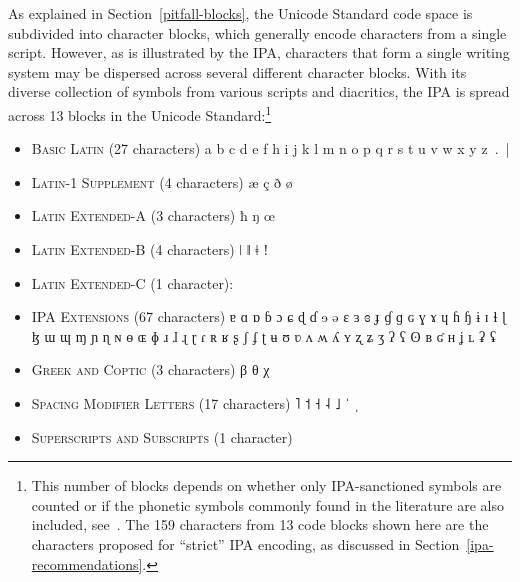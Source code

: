 As explained in Section~\ref{pitfall-blocks}, the Unicode Standard code space is
subdivided into character blocks, which generally encode characters from a
single script. However, as is illustrated by the IPA, characters that form a
single writing system may be dispersed across several different character
blocks. With its diverse collection of symbols from various scripts and
diacritics, the IPA is spread across 13 blocks in the Unicode
Standard:\footnote{This number of blocks depends on whether only IPA-sanctioned
symbols are counted or if the phonetic symbols commonly found in the literature
are also included, see~\cite[Appendix~C]{Moran2012}. The 159 characters from 13 
code blocks shown here are the characters proposed for ``strict'' IPA encoding, 
as discussed in Section~\ref{ipa-recommendations}.}

\begin{itemize}[itemsep=4pt]
	\item \textsc{Basic Latin }(27 characters) \newline 
	a b c d e f h i j k l m n o p q r s t u v w x y z~.~|
	\item \textsc{Latin-1 Supplement} (4 characters) \newline 
	æ ç ð ø
	\item \textsc{Latin Extended-A} (3 characters) \newline 
	ħ ŋ œ
	\item \textsc{Latin Extended-B} (4 characters) \newline 
	ǀ ǁ ǂ ǃ
	\item \textsc{Latin Extended-C} (1 character): \newline
	\item \textsc{IPA Extensions} (67 characters) \newline 
	ɐ ɑ ɒ ɓ ɔ ɕ ɖ ɗ ɘ ə ɛ ɜ ɞ ɟ ɠ ɡ ɢ ɣ ɤ ɥ ɦ ɧ ɨ ɪ ɬ ɭ ɮ ɯ ɰ ɱ ɲ ɳ ɴ \newline
	ɵ ɶ ɸ ɹ ɺ ɻ ɽ ɾ ʀ ʁ ʂ ʃ ʄ ʈ ʉ ʊ ʋ ʌ ʍ ʎ ʏ ʐ ʑ ʒ ʔ ʕ ʘ ʙ ʛ ʜ ʝ ʟ ʡ ʢ 
	\item \textsc{Greek and Coptic} (3 characters) \newline 
	β θ χ
	\item \textsc{Spacing Modifier Letters} (17 characters) \newline
	      
	    ˥ ˦ ˧ ˨ ˩ {\large ˈ ˌ}
	\item \textsc{Superscripts and Subscripts} (1 character) \newline

\end{itemize}

